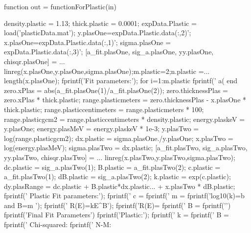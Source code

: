 function out = functionForPlastic(in)
%

density.plastic = 1.13; %
thick.plastic = 0.0001; %
expData.Plastic = load('plasticData.mat');
y.plasOne=expData.Plastic.data(:,2)'; %
x.plasOne=expData.Plastic.data(:,1)'; %
sigma.plasOne = expData.Plastic.data(:,3)';
[a_fit.plasOne, sig_a.plasOne, yy.plasOne, chisqr.plasOne] = ...
    linreg(x.plasOne,y.plasOne,sigma.plasOne);m.plastic=2;n.plastic =...
    length(x.plasOne);
fprintf('Fit parameters:\n');
for i=1:m.plastic
    fprintf(' a(%
end
zero.xPlas = abs(a_fit.plasOne(1)/a_fit.plasOne(2)); %
zero.thicknessPlas = zero.xPlas * thick.plastic;
range.plasticmeters = zero.thicknessPlas - x.plasOne * thick.plastic; %
range.plasticcentimeters = range.plasticmeters * 100; %
range.plasticgcm2 = range.plasticcentimeters * density.plastic; %
energy.plaskeV = y.plasOne; %
energy.plasMeV = energy.plaskeV * 1e-3; %
y.plasTwo = log(range.plasticgcm2);
dx.plastic = sigma.plasOne./y.plasOne;
x.plasTwo = log(energy.plasMeV);
sigma.plasTwo = dx.plastic; %
[a_fit.plasTwo, sig_a.plasTwo, yy.plasTwo, chisqr.plasTwo] = ...
    linreg(x.plasTwo,y.plasTwo,sigma.plasTwo);
dc.plastic = sig_a.plasTwo(1);
B.plastic = a_fit.plasTwo(2);
c.plastic = a_fit.plasTwo(1);
dB.plastic = sig_a.plasTwo(2);
k.plastic = exp(c.plastic);
dy.plasRange = dc.plastic + B.plastic*dx.plastic...
    + x.plasTwo * dB.plastic;
fprintf(' Plastic Fit parameters:\n');
fprintf(' c = %
fprintf(' m = %
fprintf('log10(k)=b and B=m \n');
fprintf(' R(E)=kE^B\n');
fprintf('R(E)=%
fprintf(' B = %
fprintf('\n')
fprintf('Final Fit Parameters\n')
fprintf('Plastic:\n');
fprintf(' k = %
fprintf(' B = %
fprintf(' Chi-squared: %
fprintf('         N-M: %



